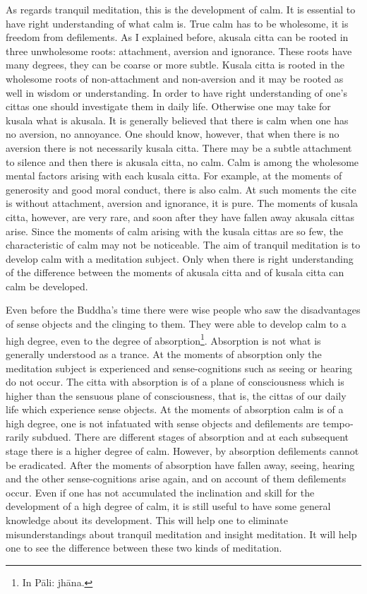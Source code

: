 \documentclass{book}
\begin{document}
As regards tranquil meditation, this is the development of calm. It is
essential to have right understanding of what calm is. True calm has to
be wholesome, it is freedom from defilements. As I explained before,
akusala citta can be rooted in three unwholesome roots: attachment,
aversion and ignorance. These roots have many degrees, they can be
coarse or more subtle. Kusala citta is rooted in the wholesome roots of
non-attachment and non-aversion and it may be rooted as well in wisdom
or understanding. In order to have right understanding of one's cittas
one should investigate them in daily life. Otherwise one may take for
kusala what is akusala. It is generally believed that there is calm     when one has no aversion, no annoyance. One should know, however, that
when there is no aversion there is not necessarily kusala citta. There
may be a subtle attachment to silence and then there is akusala citta,
no calm. Calm is among the wholesome mental factors arising with each
kusala citta. For example, at the moments of generosity and good moral conduct, there is also calm. At such moments the cite is without
attachment, aversion and ignorance, it is pure. The moments of
kusala citta, however, are very rare, and soon after they have fallen
away akusala cittas arise. Since the moments of calm arising with the
kusala cittas are so few, the characteristic of calm may not be
noticeable. The aim of tranquil meditation is to develop calm with a
meditation subject. Only when there is right understanding of the
difference between the moments of akusala citta and of kusala citta can
calm be developed.

Even before the Buddha's time there were wise people who saw the
disadvantages of sense objects and the clinging to them. They were
able to develop calm to a high degree, even to the degree of
absorption\footnote{In Pāli: jhāna.}. Absorption is not what is
generally understood as a trance. At the moments of absorption only the
meditation subject is experienced and sense-cognitions such as seeing
or hearing do not occur. The citta with absorption is of a plane of
consciousness which is higher than the sensuous plane of consciousness,
that is, the cittas of our daily life which experience sense objects.     At the moments of absorption calm is of a high degree, one is not
infatuated with sense objects and defilements are tempo­rarily subdued.
There are different stages of absorption and at each subsequent stage
there is a higher degree of calm. However, by absorption defilements
cannot be eradicated. After the moments of absorption have fallen away,
seeing, hearing and the other sense-cognitions arise again, and on
account of them defilements occur. Even if one has not accumulated
the inclination and skill for the development of a high degree of calm,
it is still useful to have some general knowledge about its development.
This will help one to eliminate misunderstandings about tranquil
meditation and insight meditation. It will help one to see the
difference between these two kinds of meditation.
\end{document}
